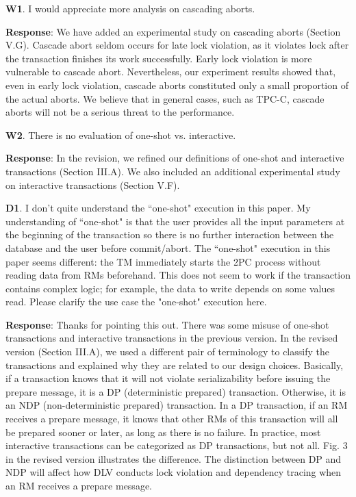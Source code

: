 \documentclass[conference]{IEEEtran}
\begin{document}
\begin{frame}{\relax}
\textbf{W1}. I would appreciate more analysis on cascading aborts.

\textbf{Response}: We have added an experimental study on cascading aborts (Section V.G). Cascade abort seldom occurs for late lock violation, as it violates lock after the transaction finishes its work successfully. Early lock violation is more vulnerable to cascade abort. Nevertheless, our experiment results showed that, even in early lock violation, cascade aborts constituted only a small proportion of the actual aborts. We believe that in general cases, such as TPC-C, cascade aborts will not be a serious threat to the performance.

\textbf{W2}. There is no evaluation of one-shot vs. interactive.

\textbf{Response}: In the revision, we refined our definitions of one-shot and interactive transactions (Section III.A). We also included an additional experimental study on interactive transactions (Section V.F).

\textbf{D1}. I don't quite understand the ``one-shot" execution in this paper. My understanding of ``one-shot" is that the user provides all the input parameters at the beginning of the transaction so there is no further interaction between the database and the user before commit/abort. The ``one-shot" execution in this paper seems different: the TM immediately starts the 2PC process without reading data from RMs beforehand. This does not seem to work if the transaction contains complex logic; for example, the data to write depends on some values read. Please clarify the use case the "one-shot" execution here. 

\textbf{Response}: Thanks for pointing this out. There was some misuse of one-shot transactions and interactive transactions in the previous version.
In the revised version (Section III.A), we used a different pair of terminology to classify the transactions and explained why they are related to our design choices. Basically, if a transaction knows that it will not violate serializability before issuing the prepare message, it is a DP (deterministic prepared) transaction. Otherwise, it is an NDP (non-deterministic prepared) transaction. In a DP transaction, if an RM receives a prepare message, it knows that other RMs of this transaction will all be prepared sooner or later, as long as there is no failure. In practice, most interactive transactions can be categorized as DP transactions, but not all. Fig. 3 in the revised version illustrates the difference. The distinction between DP and NDP will affect how DLV conducts lock violation and dependency tracing when an RM receives a prepare message.


\end{frame}
\end{document}
